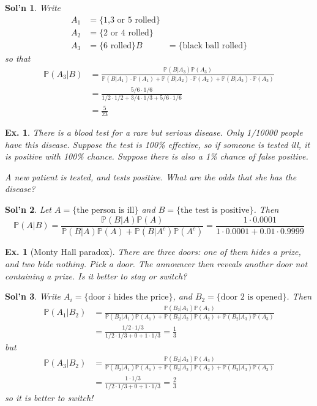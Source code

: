 \documentclass[12pt, a4paper]{book}
\renewcommand{\Pr}{\mathbb{P}}
\newtheorem{example}[theorem]{Ex.}
\theoremstyle{nonumberplain}
\newtheorem{solution}{Sol'n}
\begin{document}
\begin{solution}
    Write
    \begin{align*}
        A_1 &= \{\text{1,3 or 5 rolled}\}\\
        A_2 &= \{\text{2 or 4 rolled}\}\\
        A_3 &= \{\text{6 rolled}\}
        B &= \{\text{black ball rolled}\}
    \end{align*}
    so that
    \begin{align*}
        \Pr(A_3|B) &= \frac{\Pr(B|A_3)\Pr(A_3)}{\Pr(B|A_1)\cdot \Pr(A_1)+\Pr(B|A_2)\cdot\Pr(A_2)+\Pr(B|A_3)\cdot\Pr(A_3)}\\
                   &= \frac{5/6\cdot 1/6}{1/2\cdot 1/2+3/4\cdot1/3+5/6\cdot 1/6}\\
                   &=\frac{5}{23}
    \end{align*}
\end{solution}
\begin{example}
    There is a blood test for a rare but serious disease.
    Only 1/10000 people have this disease.
    Suppose the test is 100\% effective, so if someone is tested ill, it is positive with 100\% chance.
    Suppose there is also a 1\% chance of false positive.

    A new patient is tested, and tests positive.
    What are the odds that she has the disease?
\end{example}
\begin{solution}
    Let $A=\{\text{the person is ill}\}$ and $B=\{\text{the test is positive}\}$.
    Then
    \[\Pr(A|B)=\frac{\Pr(B|A)\Pr(A)}{\Pr(B|A)\Pr(A)+\Pr(B|A^c)\Pr(A^c)}=\frac{1\cdot 0.0001}{1\cdot 0.0001+0.01\cdot0.9999}\]
\end{solution}
\begin{example}[Monty Hall paradox]
    There are three doors: one of them hides a prize, and two hide nothing.
    Pick a door.
    The announcer then reveals another door not containing a prize.
    Is it better to stay or switch?
\end{example}
\begin{solution}
    Write $A_i=\{\text{door $i$ hides the price}\}$, and $B_2=\{\text{door $2$ is opened}\}$.
    Then
    \begin{align*}
        \Pr(A_1|B_2)&=\frac{\Pr(B_2|A_1)\Pr(A_1)}{\Pr(B_2|A_1)\Pr(A_1)+\Pr(B_2|A_2)\Pr(A_2)+\Pr(B_2|A_3)\Pr(A_3)}\\
                                         &=\frac{1/2\cdot1/3}{1/2\cdot1/3+0+1\cdot1/3}=\frac{1}{3}
    \end{align*}
    but
    \begin{align*}
        \Pr(A_3|B_2)&=\frac{\Pr(B_2|A_3)\Pr(A_3)}{\Pr(B_2|A_1)\Pr(A_1)+\Pr(B_2|A_2)\Pr(A_2)+\Pr(B_2|A_3)\Pr(A_3)}\\
                                         &=\frac{1\cdot1/3}{1/2\cdot1/3+0+1\cdot1/3}=\frac{2}{3}
    \end{align*}
    so it is better to switch!
\end{solution}
\end{document}
